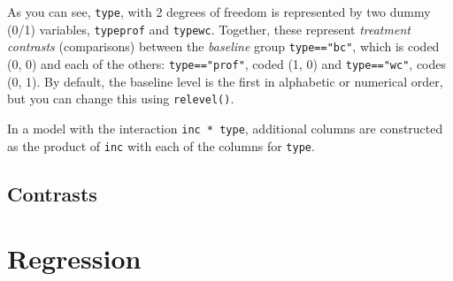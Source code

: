 \documentclass[
  letterpaper,
  10pt,
  krantz2]{krantz}
\makeatletter
\newenvironment{Shaded}{\begin{snugshade}}{\end{snugshade}}
\newcommand{\CommentTok}[1]{\textcolor[rgb]{0.37,0.37,0.37}{#1}}
\newcommand{\FunctionTok}[1]{\textcolor[rgb]{0.28,0.35,0.67}{#1}}
\newcommand{\NormalTok}[1]{\textcolor[rgb]{0.00,0.23,0.31}{#1}}
\newcommand{\SpecialCharTok}[1]{\textcolor[rgb]{0.37,0.37,0.37}{#1}}
\newenvironment{kframe}{%
  \medskip{}
  \setlength{\fboxsep}{.8em}
  \def\at@end@of@kframe{}%
  \ifinner\ifhmode%
  \def\at@end@of@kframe{\end{minipage}}%
  \begin{minipage}{\columnwidth}%
  \fi\fi%
  \def\FrameCommand##1{\hskip\@totalleftmargin \hskip-\fboxsep
  \colorbox{shadecolor}{##1}\hskip-\fboxsep
      \hskip-\linewidth \hskip-\@totalleftmargin \hskip\columnwidth}%
  \MakeFramed {\advance\hsize-\width
    \@totalleftmargin\z@ \linewidth\hsize
    \@setminipage}}%
{\par\unskip\endMakeFramed%
  \at@end@of@kframe}
\renewenvironment{Shaded}{\begin{kframe}}{\end{kframe}}
\makeatother
\begin{document}
As you can see, \texttt{type}, with 2 degrees of freedom is represented
by two dummy (0/1) variables, \texttt{typeprof} and \texttt{typewc}.
Together, these represent \emph{treatment contrasts} (comparisons)
between the \emph{baseline} group \texttt{type=="bc"}, which is coded
(0, 0) and each of the others: \texttt{type=="prof"}, coded (1, 0) and
\texttt{type=="wc"}, codes (0, 1). By default, the baseline level is the
first in alphabetic or numerical order, but you can change this using
\texttt{relevel()}.

In a model with the interaction \texttt{inc\ *\ type}, additional
columns are constructed as the product of \texttt{inc} with each of the
columns for \texttt{type}.

\begin{Shaded}
\end{Shaded}

\subsection{Contrasts}\label{sec-contrasts}

\section{Regression}\label{regression}
\end{document}
